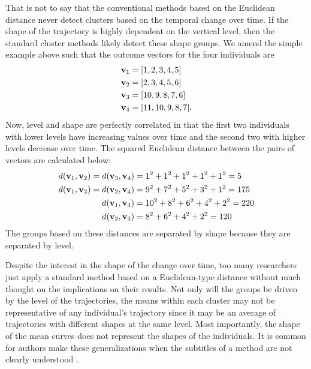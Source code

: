 That is not to say that the conventional methods based on the Euclidean distance never detect clusters based on the temporal change over time. If the shape of the trajectory is highly dependent on the vertical level, then the standard cluster methods likely detect these shape groups. We amend the simple example above such that the outcome vectors for the four individuals are
\begin{align*}
\mathbf v_{1}&=[1,2,3,4,5]\\
\mathbf v_{2}&=[2,3,4,5,6]\\
\mathbf v_{3}&=[10,9,8,7,6]\\
\mathbf v_{4}&=[11,10,9,8,7].
\end{align*}
Now, level and shape are perfectly correlated in that the first two individuals with lower levels have increasing values over time and the second two with higher levels decrease over time. The squared Euclidean distance between the pairs of vectors are calculated below:
\begin{align*}
d(\mathbf v_{1},\mathbf v_{2}) = d(\mathbf v_{3},\mathbf v_{4}) &= 1^{2}+1^{2}+1^{2}+1^{2} + 1^{2} = 5\\
d(\mathbf v_{1},\mathbf v_{3}) = d(\mathbf v_{2},\mathbf v_{4}) &= 9^{2}+7^{2}+5^{2}+3^{2}+1^{2}=175\\
d(\mathbf v_{1},\mathbf v_{4}) &= 10^{2}+8^{2}+6^{2}+4^{2}+2^{2}=220\\
d(\mathbf v_{2},\mathbf v_{3}) &= 8^{2}+6^{2}+4^{2}+2^{2}=120
\end{align*}
The groups based on these distances are separated by shape because they are separated by level. 

Despite the interest in the shape of the change over time, too many researchers just apply a standard method based on a Euclidean-type distance without much thought on the implications on their results. Not only will the groups be driven by the level of the trajectories, the means within each cluster may not be representative of any individual's trajectory since it may be an average of trajectories with different shapes at the same level. Most importantly, the shape of the mean curves does not represent the shapes of the individuals. It is common for authors make these generalizations when the subtitles of a method are not clearly understood \cite{windle2004,mulvaney2006,broadbent2008,pryor2011,mccoy2010}. 

